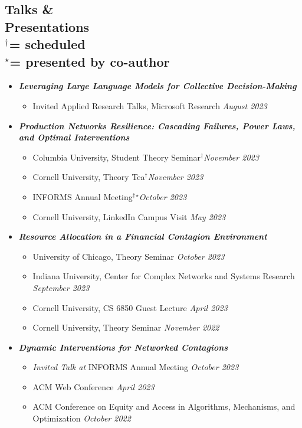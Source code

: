 \documentclass[margin]{res}
\newcommand{\scheduled}[0]{\ensuremath {^\dagger}}
\newcommand{\presentedbycoauthor}[0]{\ensuremath {^{\star}}}
\newcommand{\bemph}[1]{\textbf{\emph{#1}}}
\begin{document}
\begin{resume}
\section{Talks \& \\ Presentations \\
\footnotesize
\scheduled  = \textup{scheduled} \\ \presentedbycoauthor = \textup{presented by co-author}
}

\begin{itemize}[nosep]
	\item \bemph{Leveraging Large Language Models for Collective Decision-Making}
	\begin{itemize}[nosep]
		\item Invited Applied Research Talks, Microsoft Research \hfill \emph{August 2023}
	\end{itemize}

	\item \bemph{Production Networks Resilience: Cascading Failures, Power Laws, and Optimal Interventions}
	\begin{itemize}[nosep]
		\item Columbia University, Student Theory Seminar\scheduled \hfill \emph{November 2023}
		\item Cornell University, Theory Tea\scheduled \hfill \emph{November 2023}
		\item INFORMS Annual Meeting\scheduled\presentedbycoauthor \hfill \emph{October 2023}
		\item Cornell University, LinkedIn Campus Visit \hfill \emph{May 2023}
	\end{itemize}

	\item \bemph{Resource Allocation in a Financial Contagion Environment}
	\begin{itemize}[nosep]
		\item University of Chicago, Theory Seminar \hfill \emph{October 2023}
		\item Indiana University, Center for Complex Networks and Systems Research \\ \hfill \emph{September 2023} 
		\item Cornell University, CS 6850 Guest Lecture \hfill \emph{April 2023}
		\item Cornell University, Theory Seminar \hfill \emph{November 2022}
	\end{itemize}
	
	\item \bemph{Dynamic Interventions for Networked Contagions}
	\begin{itemize}[nosep]
		\item \emph{Invited Talk at} INFORMS Annual Meeting \hfill \emph{October 2023}
		\item ACM Web Conference \hfill \emph{April 2023}	
		\item ACM Conference on Equity and Access in Algorithms, Mechanisms, and Optimization \hfill \emph{October 2022}
	\end{itemize}


\end{itemize}
\end{resume}
\end{document}
